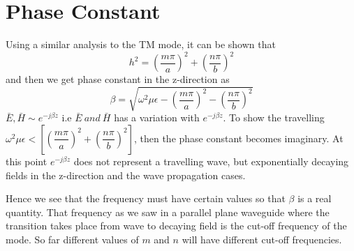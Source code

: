 \section{Phase Constant}
Using a similar analysis to the TM mode, it can be shown that 
$$h^2 =\left(\dfrac{m\pi}{a}\right)^2 + \left(\dfrac{n\pi}{b}\right)^2$$ 
and then we get phase constant in the z-direction as 
$$\beta = \sqrt{\omega^2\mu\epsilon-\left(\dfrac{m\pi}{a}\right)^2- \left(\dfrac{n\pi}{b}\right)^2}$$
$\bar{E},\bar{H}\sim e^{-j\beta z}$ i.e $\bar{E}\ and\ \bar{H}$ has a variation with $e^{-j\beta z}$. To show the travelling $\omega^2\mu\epsilon < \left[\left(\dfrac{m\pi}{a}\right)^2 + \left(\dfrac{n\pi}{b}\right)^2\right]$, then the phase constant becomes imaginary. At this point $e^{-j\beta z}$ does not represent a travelling wave, but exponentially decaying fields in the z-direction and the wave propagation cases.

Hence we see that the frequency must have certain values so that $\beta$ is a real quantity. That frequency as we saw in a parallel plane waveguide where the transition takes place from wave to decaying field is the cut-off frequency of the mode. So far different values of $m$ and $n$ will have different cut-off frequencies. 

